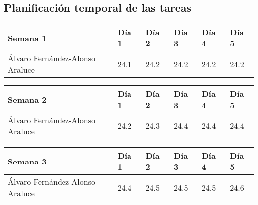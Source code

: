 \subsection{Planificación temporal de las tareas}

\begin{table}[h]
	\centering
	\begin{tabular}{| p{2cm} | p{2cm} | p{2cm} | p{2cm} | p{2cm} | p{2cm} |}
		\rowcolor[HTML]{329A9D} 
		 {\color[HTML]{FFFFFF} \textbf{Semana 1}} & {\color[HTML]{FFFFFF} \textbf{Día 1}} & {\color[HTML]{FFFFFF} \textbf{Día 2}} & {\color[HTML]{FFFFFF} \textbf{Día 3}} & {\color[HTML]{FFFFFF} \textbf{Día 4}}  & {\color[HTML]{FFFFFF} \textbf{Día 5}} \\ \hline
		Álvaro Fernández-Alonso Araluce & 24.1 & 24.2 & 24.2 & 24.2 & 24.2 \\ \hline
	\end{tabular}
\end{table}

\begin{table}[h]
	\centering
	\begin{tabular}{| p{2cm} | p{2cm} | p{2cm} | p{2cm} | p{2cm} | p{2cm} |}
		\rowcolor[HTML]{329A9D} 
		{\color[HTML]{FFFFFF} \textbf{Semana 2}} & {\color[HTML]{FFFFFF} \textbf{Día 1}} & {\color[HTML]{FFFFFF} \textbf{Día 2}} & {\color[HTML]{FFFFFF} \textbf{Día 3}} & {\color[HTML]{FFFFFF} \textbf{Día 4}}  & {\color[HTML]{FFFFFF} \textbf{Día 5}} \\ \hline
		Álvaro Fernández-Alonso Araluce & 24.2 & 24.3 & 24.4 & 24.4 & 24.4 \\ \hline
	\end{tabular}
\end{table}

\begin{table}[h]
	\centering
	\begin{tabular}{| p{2cm} | p{2cm} | p{2cm} | p{2cm} | p{2cm} | p{2cm} |}
		\rowcolor[HTML]{329A9D} 
		{\color[HTML]{FFFFFF} \textbf{Semana 3}} & {\color[HTML]{FFFFFF} \textbf{Día 1}} & {\color[HTML]{FFFFFF} \textbf{Día 2}} & {\color[HTML]{FFFFFF} \textbf{Día 3}} & {\color[HTML]{FFFFFF} \textbf{Día 4}}  & {\color[HTML]{FFFFFF} \textbf{Día 5}} \\ \hline
		Álvaro Fernández-Alonso Araluce & 24.4 & 24.5 & 24.5 & 24.5 & 24.6 \\ \hline
	\end{tabular}
\end{table}

